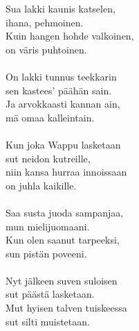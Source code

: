 
Sua lakki kaunis katselen, \\ ihana, pehmoinen. \\ Kuin hangen hohde valkoinen, \\ on väris puhtoinen. \\ \hspace{10mm} \\ On lakki tunnus teekkarin \\ sen kastees' päähän sain. \\ Ja arvokkaasti kannan ain, \\ mä omaa kalleintain. \\ \hspace{10mm} \\ Kun joka Wappu lasketaan \\ sut neidon kutreille, \\ niin kansa hurraa innoissaan \\ on juhla kaikille. \\ \hspace{10mm} \\ Saa susta juoda sampanjaa, \\ mun mielijuomaani. \\ Kun olen saanut tarpeeksi, \\ sun pistän poveeni. \\ \hspace{10mm} \\ Nyt jälkeen suven suloisen \\ sut päästä lasketaan. \\ Mut hyisen talven tuiskeessa \\ sut silti muistetaan.